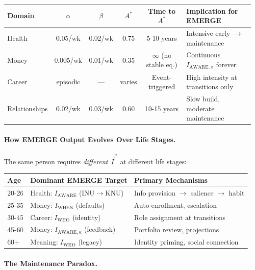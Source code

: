 \begin{center}
\small
\begin{tabular}{@{}lccccl@{}}
\toprule
\textbf{Domain} & $\alpha$ & $\beta$ & $A^*$ & \textbf{Time to $A^*$} & \textbf{Implication for EMERGE} \\
\midrule
Health & 0.05/wk & 0.02/wk & 0.75 & 5-10 years & Intensive early $\to$ maintenance \\
Money & 0.005/wk & 0.01/wk & 0.35 & $\infty$ (no stable eq.) & Continuous $I_{\text{AWARE},\kappa}$ forever \\
Career & episodic & --- & varies & Event-triggered & High intensity at transitions only \\
Relationships & 0.02/wk & 0.03/wk & 0.60 & 10-15 years & Slow build, moderate maintenance \\
\bottomrule
\end{tabular}
\end{center}

\paragraph{How EMERGE Output Evolves Over Life Stages.}

The same person requires \emph{different} $\vec{I}^*$ at different life stages:

\begin{center}
\small
\begin{tabular}{@{}lp{4cm}p{5.5cm}@{}}
\toprule
\textbf{Age} & \textbf{Dominant EMERGE Target} & \textbf{Primary Mechanisms} \\
\midrule
20-26 & Health: $I_{\text{AWARE}}$ (INU$\to$KNU) & Info provision $\to$ salience $\to$ habit \\
25-35 & Money: $I_{\text{WHEN}}$ (defaults) & Auto-enrollment, escalation \\
30-45 & Career: $I_{\text{WHO}}$ (identity) & Role assignment at transitions \\
45-60 & Money: $I_{\text{AWARE},\kappa}$ (feedback) & Portfolio review, projections \\
60+ & Meaning: $I_{\text{WHO}}$ (legacy) & Identity priming, social connection \\
\bottomrule
\end{tabular}
\end{center}

\paragraph{The Maintenance Paradox.}

